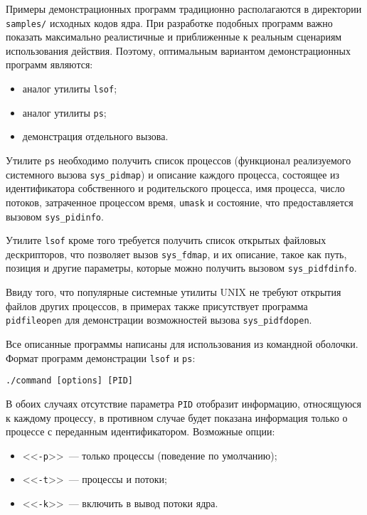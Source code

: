 Примеры демонстрационных программ традиционно располагаются в директории
\texttt{samples/} исходных кодов ядра. При разработке подобных программ важно
показать максимально реалистичные и приближенные к реальным сценариям
использования действия. Поэтому, оптимальным вариантом демонстрационных программ
являются:
\begin{itemize}
\item аналог утилиты \texttt{lsof};
\item аналог утилиты \texttt{ps};
\item демонстрация отдельного вызова.
\end{itemize}

Утилите \texttt{ps} необходимо получить список процессов (функционал
реализуемого системного вызова \texttt{sys\_pidmap}) и описание каждого процесса,
состоящее из идентификатора собственного и родительского процесса, имя процесса,
число потоков, затраченное процессом время, \texttt{umask} и состояние, что
предоставляется вызовом \texttt{sys\_pidinfo}.

Утилите \texttt{lsof} кроме того требуется получить список открытых файловых
дескрипторов, что позволяет вызов \texttt{sys\_fdmap}, и их описание, такое как
путь, позиция и другие параметры, которые можно получить вызовом
\texttt{sys\_pidfdinfo}.

Ввиду того, что популярные системные утилиты UNIX не требуют открытия файлов
других процессов, в примерах также присутствует программа \texttt{pidfileopen}
для демонстрации возможностей вызова \texttt{sys\_pidfdopen}.

Все описанные программы написаны для использования из командной оболочки. Формат
программ демонстрации \texttt{lsof} и \texttt{ps}:

\medskip
\begin{lstlisting}[style=cstyle]
./command [options] [PID]
\end{lstlisting}
\medskip

В обоих случаях отсутствие параметра \texttt{PID} отобразит информацию,
относящуюся к каждому процессу, в противном случае будет показана информация
только о процессе с переданным идентификатором. Возможные опции:
\begin{itemize}
\item <<\texttt{-p}>>~--- только процессы (поведение по умолчанию);
\item <<\texttt{-t}>>~--- процессы и потоки;
\item <<\texttt{-k}>>~--- включить в вывод потоки ядра.
\end{itemize}

